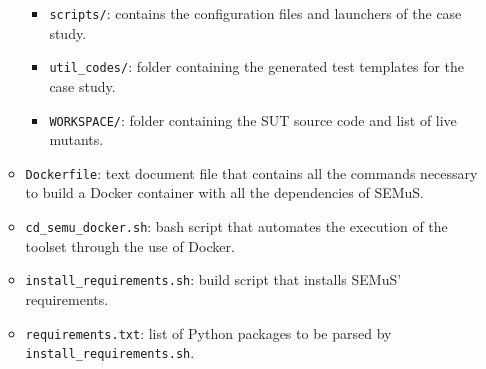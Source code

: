 \begin{itemize}
\begin{itemize}
\begin{itemize}
        \item \texttt{scripts/}: contains the configuration files and launchers of the case study.
        \item \texttt{util\_codes/}: folder containing the generated test templates for the case study.
        \item \texttt{WORKSPACE/}: folder containing the SUT source code and list of live mutants.
      \end{itemize}
      \item \texttt{Dockerfile}: text document file that contains all the commands necessary to build a Docker container with all the dependencies of SEMuS.
      \item \texttt{cd\_semu\_docker.sh}: bash script that automates the execution of the toolset through the use of Docker.
      \item \texttt{install\_requirements.sh}: build script that installs SEMuS' requirements.
      \item \texttt{requirements.txt}: list of Python packages to be parsed by \texttt{install\_requirements.sh}.
    \end{itemize}
\end{itemize}







